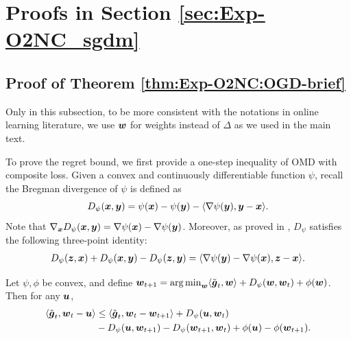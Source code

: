 \section{Proofs in Section \ref{sec:Exp-O2NC_sgdm}}
\label{app:Exp-O2NC:sgdm}

\subsection{Proof of Theorem \ref{thm:Exp-O2NC:OGD-brief}}

Only in this subsection, to be more consistent with the notations in online learning literature, we use ${\boldsymbol{w}}$ for weights instead of $\Delta$ as we used in the main text.

To prove the regret bound, we first provide a one-step inequality of OMD with composite loss. Given a convex and continuously differentiable function $\psi$, recall the Bregman divergence of $\psi$ is defined as
\begin{equation*}
    D_\psi({\boldsymbol{x}},{\boldsymbol{y}}) = \psi({\boldsymbol{x}}) - \psi({\boldsymbol{y}}) - \langle \nabla\psi({\boldsymbol{y}}), {\boldsymbol{y}}-{\boldsymbol{x}}\rangle.
\end{equation*}
Note that $\nabla_{\boldsymbol{x}} D_\psi({\boldsymbol{x}},{\boldsymbol{y}}) = \nabla \psi({\boldsymbol{x}}) - \nabla\psi({\boldsymbol{y}})$. Moreover, as proved in \cite{chen1993convergence}, $D_\psi$ satisfies the following three-point identity:
\begin{align*}
    D_\psi({\boldsymbol{z}},{\boldsymbol{x}}) + D_\psi({\boldsymbol{x}},{\boldsymbol{y}}) - D_\psi({\boldsymbol{z}},{\boldsymbol{y}}) = \langle \nabla\psi({\boldsymbol{y}}) - \nabla\psi({\boldsymbol{x}}), {\boldsymbol{z}}-{\boldsymbol{x}}\rangle.
\end{align*}

\begin{lemma}
\label{lem:Exp-O2NC:OMD-one-step}
Let $\psi, \phi$ be convex, and define ${\boldsymbol{w}}_{t+1} = \mathop{\operatorname{arg\,min}}_{\boldsymbol{w}} \langle \tilde{{\boldsymbol{g}}}_t,{\boldsymbol{w}}\rangle + D_\psi({\boldsymbol{w}},{\boldsymbol{w}}_t) + \phi({\boldsymbol{w}})$. Then for any ${\boldsymbol{u}}$,
\begin{align*}
    \langle \tilde{{\boldsymbol{g}}}_t, {\boldsymbol{w}}_t-{\boldsymbol{u}}\rangle 
    &\le \langle \tilde{{\boldsymbol{g}}}_t, {\boldsymbol{w}}_t-{\boldsymbol{w}}_{t+1}\rangle + D_\psi({\boldsymbol{u}},{\boldsymbol{w}}_t) \\
    &- D_\psi({\boldsymbol{u}},{\boldsymbol{w}}_{t+1}) - D_\psi({\boldsymbol{w}}_{t+1},{\boldsymbol{w}}_t) + \phi({\boldsymbol{u}}) - \phi({\boldsymbol{w}}_{t+1}).
\end{align*}
\end{lemma}


